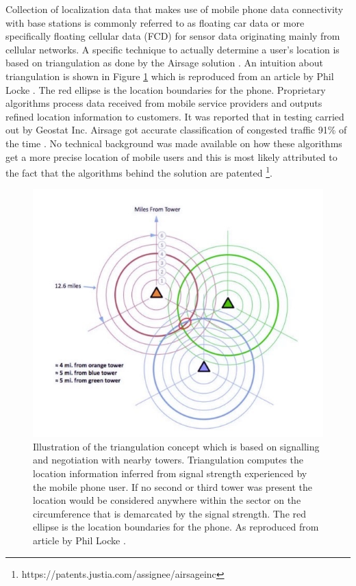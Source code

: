 \documentclass[12pt, a4paper]{report}
\theoremstyle{definition}
\theoremstyle{definition}%
\theoremstyle{definition}%
\theoremstyle{definition}%
\theoremstyle{definition}%
\theoremstyle{definition}%
\begin{document}
Collection of localization data that makes use of mobile phone data connectivity with base stations is commonly referred to as floating car data or more specifically floating cellular data (FCD) for sensor data originating mainly from cellular networks. A specific technique to actually determine a user's location is based on triangulation as done by the Airsage solution \cite{Hoteit2014}. An intuition about triangulation is shown in Figure \ref{fig:triangulation} which is reproduced from an article by Phil Locke \cite{phil_locke_2012}. The red ellipse is the location boundaries for the phone. Proprietary algorithms process data received from mobile service providers and outputs refined location information to customers. It was reported that in testing carried out by Geostat Inc. Airsage got accurate classification of congested traffic 91\% of the time  \cite{Wang2012}. No technical background was made available on how these algorithms get a more precise location of mobile users and this is most likely attributed to the fact that the algorithms behind the solution are patented \footnote{https://patents.justia.com/assignee/airsage\-inc}.  

\begin{figure}[!] 
	\includegraphics[scale=0.75]{triangulation.jpg}
	\centering
	\caption[Triangulation concept]{
		Illustration of the triangulation concept which is based on signalling and negotiation with nearby towers. Triangulation computes the location information inferred from signal strength experienced by the mobile phone user. If no second or third tower was present the location would be considered anywhere within the sector on the circumference that is demarcated by the signal strength. The red ellipse is the location boundaries for the phone. As reproduced from article by Phil Locke \cite{phil_locke_2012}.}
	\label{fig:triangulation}
\end{figure}
\end{document}
